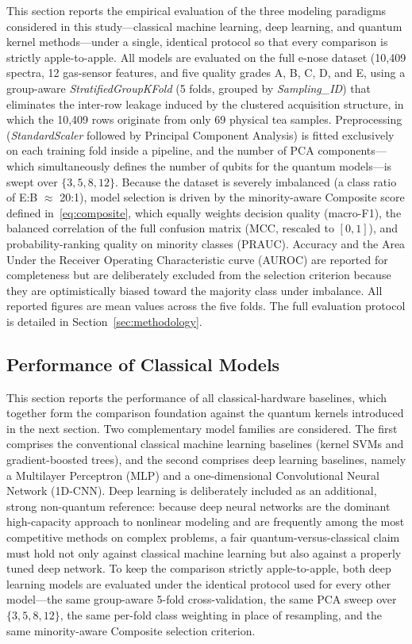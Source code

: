 \documentclass{ieeeaccess}
\begin{document}
This section reports the empirical evaluation of the three modeling paradigms considered in this study---classical machine learning, deep learning, and quantum kernel methods---under a single, identical protocol so that every comparison is strictly apple-to-apple. All models are evaluated on the full e-nose dataset (10{,}409 spectra, 12 gas-sensor features, and five quality grades A, B, C, D, and E, using a group-aware \textit{StratifiedGroupKFold} (5 folds, grouped by \textit{Sampling\_ID}) that eliminates the inter-row leakage induced by the clustered acquisition structure, in which the 10{,}409 rows originate from only 69 physical tea samples. Preprocessing (\textit{StandardScaler} followed by Principal Component Analysis) is fitted exclusively on each training fold inside a pipeline, and the number of PCA components---which simultaneously defines the number of qubits for the quantum models---is swept over $\{3,5,8,12\}$. Because the dataset is severely imbalanced (a class ratio of E:B $\approx$ 20:1), model selection is driven by the minority-aware Composite score defined in~\eqref{eq:composite}, which equally weights decision quality (macro-F1), the balanced correlation of the full confusion matrix (MCC, rescaled to $[0,1]$), and probability-ranking quality on minority classes (PRAUC). Accuracy and the Area Under the Receiver Operating Characteristic curve (AUROC) are reported for completeness but are deliberately excluded from the selection criterion because they are optimistically biased toward the majority class under imbalance. All reported figures are mean values across the five folds. The full evaluation protocol is detailed in Section~\ref{sec:methodology}.

\subsection{Performance of Classical Models}

This section reports the performance of all classical-hardware baselines, which together form the comparison foundation against the quantum kernels introduced in the next section. Two complementary model families are considered. The first comprises the conventional classical machine learning baselines (kernel SVMs and gradient-boosted trees), and the second comprises deep learning baselines, namely a Multilayer Perceptron (MLP) and a one-dimensional Convolutional Neural Network (1D-CNN). Deep learning is deliberately included as an additional, strong non-quantum reference: because deep neural networks are the dominant high-capacity approach to nonlinear modeling and are frequently among the most competitive methods on complex problems, a fair quantum-versus-classical claim must hold not only against classical machine learning but also against a properly tuned deep network. To keep the comparison strictly apple-to-apple, both deep learning models are evaluated under the identical protocol used for every other model---the same group-aware 5-fold cross-validation, the same PCA sweep over $\{3,5,8,12\}$, the same per-fold class weighting in place of resampling, and the same minority-aware Composite selection criterion.
\end{document}
